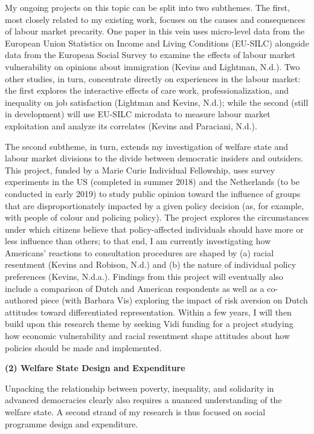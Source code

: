 \documentclass[letterpaper]{scrartcl}
\begin{document}
  My ongoing projects on this topic can be split into two subthemes. The first, most closely related to my existing work, focuses on the causes and consequences of labour market precarity. One paper in this vein uses micro-level data from the European Union Statistics on Income and Living Conditions (EU-SILC) alongside data from the European Social Survey to examine the effects of labour market vulnerability on opinions about immigration (Kevins and Lightman, N.d.). Two other studies, in turn, concentrate directly on experiences in the labour market: the first explores the interactive effects of care work, professionalization, and inequality on job satisfaction (Lightman and Kevins, N.d.); while the second (still in development) will use EU-SILC microdata to measure labour market exploitation and analyze its correlates (Kevins and Paraciani, N.d.).

  The second subtheme, in turn, extends my investigation of welfare state and labour market divisions to the divide between democratic insiders and outsiders. This project, funded by a Marie Curie Individual Fellowship, uses survey experiments in the US (completed in summer 2018) and the Netherlands (to be conducted in early 2019) to study public opinion toward the influence of groups that are disproportionately impacted by a given policy decision (as, for example, with people of colour and policing policy). The project explores the circumstances under which citizens believe that policy-affected individuals should have more or less influence than others; to that end, I am currently investigating how Americans' reactions to consultation procedures are shaped by (a) racial resentment (Kevins and Robison, N.d.) and (b) the nature of individual policy preferences (Kevins, N.d.a.). Findings from this project will eventually also include a comparison of Dutch and American respondents as well as a co-authored piece (with Barbara Vis) exploring the impact of risk aversion on Dutch attitudes toward differentiated representation. Within a few years, I will then build upon this research theme by seeking Vidi funding for a project studying how economic vulnerability and racial resentment shape attitudes about how policies should be made and implemented.

  \textbf{(2) Welfare State Design and Expenditure}
  \vspace{-1em}

  Unpacking the relationship between poverty, inequality, and solidarity in advanced democracies clearly also requires a nuanced understanding of the welfare state. A second strand of my research is thus focused on social programme design and expenditure.
\end{document}

